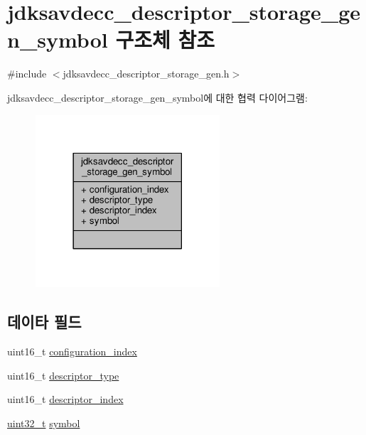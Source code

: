 \hypertarget{structjdksavdecc__descriptor__storage__gen__symbol}{}\section{jdksavdecc\+\_\+descriptor\+\_\+storage\+\_\+gen\+\_\+symbol 구조체 참조}
\label{structjdksavdecc__descriptor__storage__gen__symbol}


{\ttfamily \#include $<$jdksavdecc\+\_\+descriptor\+\_\+storage\+\_\+gen.\+h$>$}



jdksavdecc\+\_\+descriptor\+\_\+storage\+\_\+gen\+\_\+symbol에 대한 협력 다이어그램\+:
\nopagebreak
\begin{figure}[H]
\begin{center}
\leavevmode
\includegraphics[width=194pt]{structjdksavdecc__descriptor__storage__gen__symbol__coll__graph}
\end{center}
\end{figure}
\subsection*{데이타 필드}
\begin{DoxyCompactItemize}
\item 
uint16\+\_\+t \hyperlink{structjdksavdecc__descriptor__storage__gen__symbol_afaad1bd7c66f9611e134d8c5ce98f444}{configuration\+\_\+index}
\item 
uint16\+\_\+t \hyperlink{structjdksavdecc__descriptor__storage__gen__symbol_ab7c32b6c7131c13d4ea3b7ee2f09b78d}{descriptor\+\_\+type}
\item 
uint16\+\_\+t \hyperlink{structjdksavdecc__descriptor__storage__gen__symbol_a042bbc76d835b82d27c1932431ee38d4}{descriptor\+\_\+index}
\item 
\hyperlink{parse_8c_a6eb1e68cc391dd753bc8ce896dbb8315}{uint32\+\_\+t} \hyperlink{structjdksavdecc__descriptor__storage__gen__symbol_a0a81ee27053a63e71a6c7db060562eb0}{symbol}
\end{DoxyCompactItemize}


